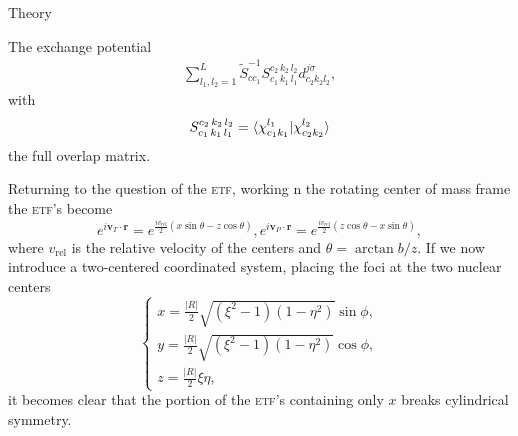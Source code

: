 \documentclass[aps, pra, reprint, groupedaddress, amsfonts,
               amsmath, amssymb, showpacs, nofootinbib]{revtex4-1}
\begin{document}
\begin{section}{Theory \label{sec:theory}}
\begin{subsection}{The exchange potential \label{sec:xpot}}
\begin{equation}
\begin{split}
                               \sum\limits_{l_1, l_2 = 1}^L \tilde{S}^{-1}_{c c_1}
                               S_{c_1 \, k_1 \, l_1 }^{c_2 \, k_2 \, l_2 } d^{j \sigma}_{c_2 k_2 l_2},
         \end{split}
      \end{equation}
      with
      \begin{equation} \label{eq:overlap}
         S_{c_1 \, k_1 \, l_1 }^{c_2 \, k_2 \, l_2 } =
            \braket{ \chi^{l_1}_{c_1 k_1} | \chi^{l_2}_{c_2 k_2} }
      \end{equation}
      the full overlap matrix.

      Returning to the question of the \textsc{etf}, working n the rotating center of mass frame the
      \textsc{etf}'s become
      \begin{subequations} \label{eq:etf}
         \begin{equation} \label{eq:etfT}
            e^{i \mathbf{v}_T \cdot \mathbf{r}} =
             e^{\frac{i v_\mathrm{rel}}{2} (x \sin \theta - z \cos \theta)},
         \end{equation}
         \begin{equation} \label{eq:etfP}
            e^{i \mathbf{v}_P \cdot \mathbf{r}} =
             e^{\frac{i v_\mathrm{rel}}{2} (z \cos \theta - x \sin \theta)},
         \end{equation}
      \end{subequations}
      where $v_\mathrm{rel}$ is the relative velocity of the centers and $\theta = \arctan b/z$. If we
      now introduce a two-centered coordinated system, placing the foci at the two nuclear centers
      \begin{equation} \label{eq:psc}
            \left\{
            \begin{array}{l}
               x = \frac{|R|}{2} \sqrt{(\xi^2 - 1)(1 - \eta^2)} \sin \phi, \\ [2ex]
               y = \frac{|R|}{2} \sqrt{(\xi^2 - 1)(1 - \eta^2)} \cos \phi, \\ [2ex]
               z = \frac{|R|}{2} \xi \eta,
            \end{array}
            \right.
      \end{equation}
      it becomes clear that the portion of the \textsc{etf}'s containing only $x$ breaks cylindrical
      symmetry.


\end{subsection}
\end{section}
\end{document}
